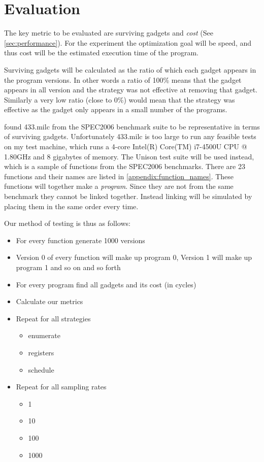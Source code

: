 \section{Evaluation}

The key metric to be evaluated are surviving gadgets and \textit{cost} (See
\ref{sec:performance}). For the experiment the optimization goal will be speed, and thus
cost will be the estimated execution time of the program.

Surviving gadgets will be calculated as the ratio of which each gadget appears in the program
versions. In other words a ratio of 100\% means that the gadget appears in all version
and the strategy was not effective at removing that gadget. Similarly a very low ratio
(close to 0\%) would mean that the strategy was effective as the gadget only appears in
a small number of the programs.

\textcite{large-scale-automated} found 433.milc from the SPEC2006 benchmark suite to be
representative in terms of surviving gadgets. Unfortunately 433.milc is too large to run
any feasible tests on my test machine, which runs a 4-core Intel(R) Core(TM) i7-4500U CPU
@ 1.80GHz and 8 gigabytes of memory. The Unison test suite will be used instead, which is
a sample of functions from the SPEC2006 benchmarks. There are 23 functions and their names
are listed in \ref{appendix:function_names}. These functions will together make a
\textit{program}. Since they are not from the same benchmark they cannot be linked
together. Instead linking will be simulated by placing them in the same order every time.

Our method of testing is thus as follows:

\begin{itemize}
	\item For every function generate 1000 versions
	\item Version 0 of every function will make up program 0, Version 1 will make up program
		1 and so on and so forth
	\item For every program find all gadgets and its cost (in cycles)
	\item Calculate our metrics
	\item Repeat for all strategies
		\begin{itemize}
			\item enumerate
			\item registers
			\item schedule
		\end{itemize}
	\item Repeat for all sampling rates
		\begin{itemize}
			\item 1
			\item 10
			\item 100
			\item 1000
		\end{itemize}
\end{itemize}
